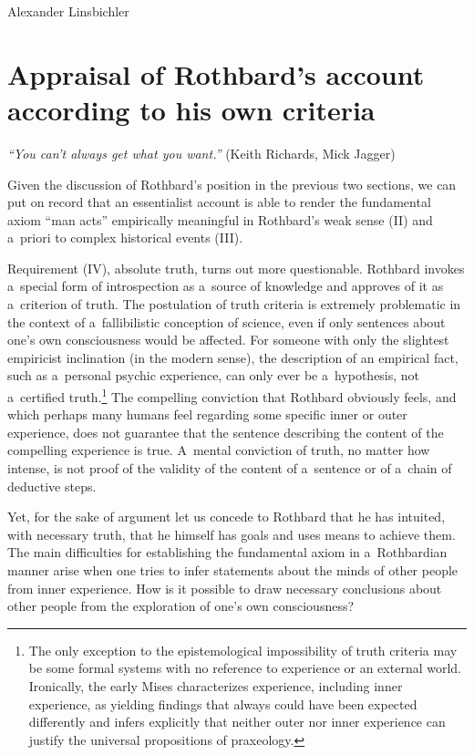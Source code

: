 \begin{artengenv}{Alexander Linsbichler}
\section{Appraisal of Rothbard's account according to his own criteria}


\begin{flushright}
\textit{``You can't always get what you want.''} (Keith Richards, Mick Jagger)
\end{flushright}






Given the discussion of Rothbard's position in the previous two sections, we can put on record that an essentialist account is able to render the fundamental axiom ``man acts'' empirically meaningful in Rothbard's weak sense (II) and a~priori to complex historical events (III).



Requirement (IV), absolute truth, turns out more questionable. Rothbard invokes a~special form of introspection as a~source of knowledge and approves of it as a~criterion of truth. The postulation of truth criteria is extremely problematic in the context of a~fallibilistic conception of science, even if only sentences about one's own consciousness would be affected. For someone with only the slightest empiricist inclination (in the modern sense), the description of an empirical fact, such as a~personal psychic experience, can only ever be a~hypothesis, not a~certified truth.\footnote{The only exception to the epistemological impossibility of truth criteria may be some formal systems with no reference to experience or an external world. Ironically, the early Mises 
\parencite*[][p.18]{mises_nationalokonomie_1940} %
 characterizes experience, including inner experience, as yielding findings that always could have been expected differently and infers explicitly that neither outer nor inner experience can justify the universal propositions of praxeology.} The compelling conviction that Rothbard obviously feels, and which perhaps many humans feel regarding some specific inner or outer experience, does not guarantee that the sentence describing the content of the compelling experience is true. A~mental conviction of truth, no matter how intense, is not proof of the validity of the content of a~sentence or of a~chain of deductive steps.



Yet, for the sake of argument let us concede to Rothbard that he has intuited, with necessary truth, that he himself has goals and uses means to achieve them. The main difficulties for establishing the fundamental axiom in a~Rothbardian manner arise when one tries to infer statements about the minds of other people from inner experience. How is it possible to draw necessary conclusions about other people from the exploration of one's own consciousness?




\end{artengenv}
